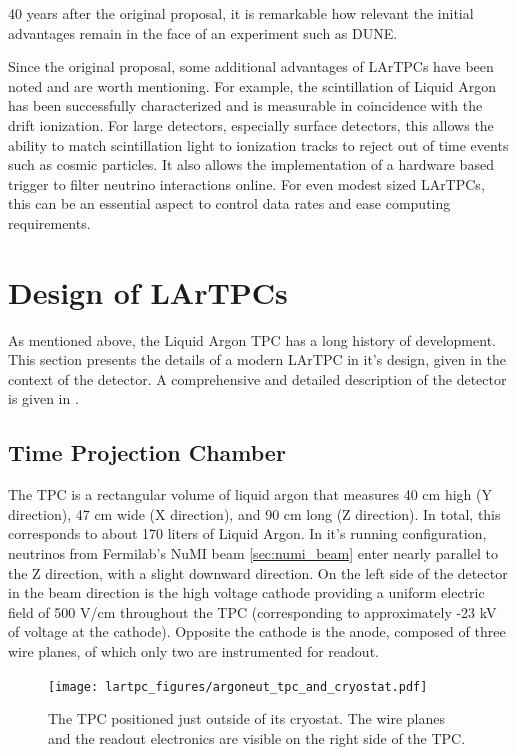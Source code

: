 40 years after the original proposal, it is remarkable how relevant the initial advantages remain in the face of an experiment such as DUNE. 

Since the original proposal, some additional advantages of LArTPCs have been noted and are worth mentioning.  For example, the scintillation of Liquid Argon has been successfully characterized and is measurable in coincidence with the drift ionization.  For large detectors, especially surface detectors, this allows the ability to match scintillation light to ionization tracks to reject out of time events such as cosmic particles.  It also allows the implementation of a hardware based trigger to filter neutrino interactions online.  For even modest sized LArTPCs, this can be an essential aspect to control data rates and ease computing requirements.

\section{Design of LArTPCs}
\label{sec:argoneut_detector}

As mentioned above, the Liquid Argon TPC has a long history of development.  This section presents the details of a modern LArTPC in it's design, given in the context of the \argoneut detector. A comprehensive and detailed description of the \argoneut detector is given in \cite{Anderson:2012vc}.

\subsection{\argoneut Time Projection Chamber}

The \argoneut TPC is a rectangular volume of liquid argon that measures 40 cm high (Y direction), 47 cm wide (X direction), and 90 cm long (Z direction).  In total, this corresponds to about 170 liters of Liquid Argon.  In it's running configuration, neutrinos from Fermilab's NuMI beam \ref{sec:numi_beam} enter nearly parallel to the Z direction, with a slight downward direction.  On the left side of the detector in the beam direction is the high voltage cathode providing a uniform electric field of 500 V/cm throughout the TPC (corresponding to approximately -23 kV of voltage at the cathode).  Opposite the cathode is the anode, composed of three wire planes, of which only two are instrumented for readout.

\begin{figure}[h]
  \centering
  \texttt{[image: lartpc\_figures/argoneut\_tpc\_and\_cryostat.pdf]}
  \caption[The \argoneut TPC]{The \argoneut TPC positioned just outside of its cryostat.  The wire planes and the readout electronics are visible on the right side of the TPC.}
  \label{fig:argoneut_tpc}
\end{figure}

